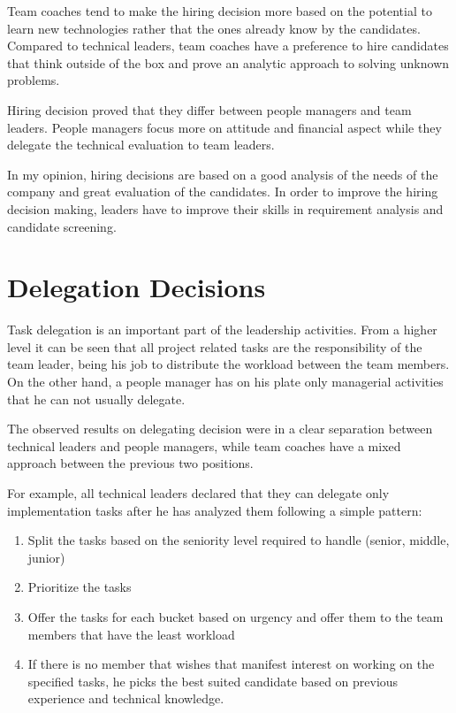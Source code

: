 Team coaches tend to make the hiring decision more based on the potential to learn new technologies rather that the ones already know by the candidates. Compared to technical leaders, team coaches have a preference to hire candidates that think outside of the box and prove an analytic approach to solving unknown problems.

Hiring decision proved that they differ between people managers and team leaders. People managers focus more on attitude and financial aspect while they delegate the technical evaluation to team leaders. 

In my opinion, hiring decisions are based on a good analysis of the needs of the company and great evaluation of the candidates. In order to improve the hiring decision making, leaders have to improve their skills in requirement analysis and candidate screening.

\section{Delegation Decisions}
\label{sec:delegation}
Task delegation is an important part of the leadership activities. From a higher level it can be seen that all project related tasks are the responsibility of the team leader, being his job to distribute the workload between the team members. On the other hand, a people manager has on his plate only managerial activities that he can not usually delegate.

The observed results on delegating decision were in a clear separation between technical leaders and people managers, while team coaches have a mixed approach between the previous two positions.

For example, all technical leaders declared that they can delegate only implementation tasks after he has analyzed them following a simple pattern:
\begin{enumerate}
\item Split the tasks based on the seniority level required to handle (senior, middle, junior)
\item Prioritize the tasks
\item Offer the tasks for each bucket based on urgency and offer them to the team members that have the least workload
\item If there is no member that wishes that manifest interest on working on the specified tasks, he picks the best suited candidate based on previous experience and technical knowledge.
\end{enumerate}

